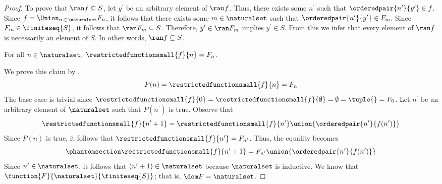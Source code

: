 \begin{proof}
    \vspace{0.3cm}
    \noindent
    To prove that \( \ran f \subseteq S \), let \( y^{\prime} \) be an arbitrary element of \( \ran f \).
    Thus, there exists some \( n^{\prime} \) such that \( \orderedpair{n^{\prime}}{y^{\prime}} \in f \).
    Since \( f = \Union_{n \,\in\, \naturalset} F_{n} \), it follows that there exists some \( m \in \naturalset \)
    such that \( \orderedpair{n^{\prime}}{y^{\prime}} \in F_{m} \).
    Since \( F_{m} \in \finiteseq{S} \), it follows that \( \ran F_{m} \subseteq S \).
    Therefore, \( y^{\prime} \in \ran F_{m} \) implies \( y^{\prime} \in S \).
    From this we infer that every element of \( \ran f \) is necessarily an element of \( S \).
    In other words, \( \ran f \subseteq S \).

    \begin{claim}
         \label{claim:f-restricted-to-n-is-equals-to-F-at-n}
        For all \( n \in \naturalset \), \( \restrictedfunctionsmall{f}{n} = F_{n} \).
    \end{claim}
    \noindent
    We prove this claim by .
    \begin{equation*}
        P(n) = \restrictedfunctionsmall{f}{n} = F_{n}
    \end{equation*}
    The base case is trivial since \( \restrictedfunctionsmall{f}{0} = \restrictedfunctionsmall{f}{\emptyset} = \emptyset = \tuple{} = F_{0} \).
    Let \( n^{\prime} \) be an arbitrary element of \( \naturalset \) such that \( P(n^{\prime}) \) is true.
    Observe that
    \begin{equation*}
        \restrictedfunctionsmall{f}{n^{\prime} + 1} = \restrictedfunctionsmall{f}{n^{\prime}} \union \mleft\{ \orderedpair{n^{\prime}}{f(n^{\prime})} \mright\}
    \end{equation*}
    Since \( P(n) \) is true, it follows that \( \restrictedfunctionsmall{f}{n^{\prime}} = F_{n^{\prime}} \).
    Thus, the equality becomes
    \begin{equation}
        \phantomsection \label{eq:f-restricted-to-n-prime-plus-one}
        \restrictedfunctionsmall{f}{n^{\prime} + 1} = F_{n^{\prime}} \union \mleft\{ \orderedpair{n^{\prime}}{f(n^{\prime})} \mright\}
    \end{equation}
    Since \( n^{\prime} \in \naturalset \), it follows that \( \mleft( n^{\prime} + 1 \mright) \in \naturalset \) because \( \naturalset \) is inductive.
    We know that \( \function{F}{\naturalset}{\finiteseq{S}} \); that is, \( \dom F = \naturalset \).

\end{proof}
